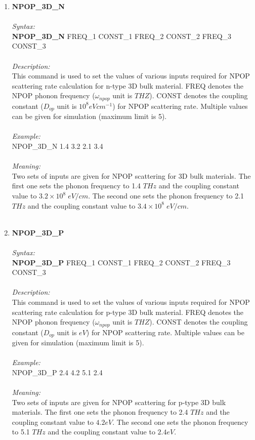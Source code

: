 \documentclass[12pt]{article}
\begin{document}
\begin{enumerate}
    \item \textbf{NPOP\_3D\_N}   \\ \\
    \textit{Syntax:} \\
    \textbf{NPOP\_3D\_N} FREQ\_1 CONST\_1 FREQ\_2 CONST\_2 FREQ\_3 CONST\_3 \\ \\
    \textit{Description:} \\
    This command is used to set the values of various inputs required for NPOP scattering rate calculation for n-type 3D bulk material. FREQ denotes the NPOP phonon frequency ($\omega_{npop}$ unit is $THZ$). CONST denotes the coupling constant ($D_{op}$ unit is $10^8 eV cm^{-1}$) for NPOP scattering rate. Multiple values can be given for simulation (maximum limit is 5). \\ \\
    \textit{Example:} \\
    NPOP\_3D\_N 1.4 3.2 2.1 3.4 \\ \\
    \textit{Meaning:} \\   
    Two sets of inputs are given for NPOP scattering for 3D bulk materials. The first one sets the phonon frequency to 1.4 $THz$ and the coupling constant value to $3.2 \times 10^{8} \; eV/cm$. The second one sets the phonon frequency to 2.1 $THz$ and the coupling constant value to $3.4 \times 10^{8} \; eV/cm$. \\ \\     

    \item \textbf{NPOP\_3D\_P}   \\ \\
    \textit{Syntax:} \\
    \textbf{NPOP\_3D\_P} FREQ\_1 CONST\_1 FREQ\_2 CONST\_2 FREQ\_3 CONST\_3 \\ \\
    \textit{Description:} \\
    This command is used to set the values of various inputs required for NPOP scattering rate calculation for p-type 3D bulk material. FREQ denotes the NPOP phonon frequency ($\omega_{npop}$ unit is $THZ$). CONST denotes the coupling constant ($D_{op}$ unit is $ eV $) for NPOP scattering rate. Multiple values can be given for simulation (maximum limit is 5). \\ \\
    \textit{Example:} \\
    NPOP\_3D\_P 2.4 4.2 5.1 2.4 \\ \\
    \textit{Meaning:} \\   
    Two sets of inputs are given for NPOP scattering for p-type 3D bulk materials. The first one sets the phonon frequency to 2.4 $THz$ and the coupling constant value to $4.2 eV $. The second one sets the phonon frequency to 5.1 $THz$ and the coupling constant value to $2.4 eV $. \\ \\     
    

\end{enumerate}
\end{document}
